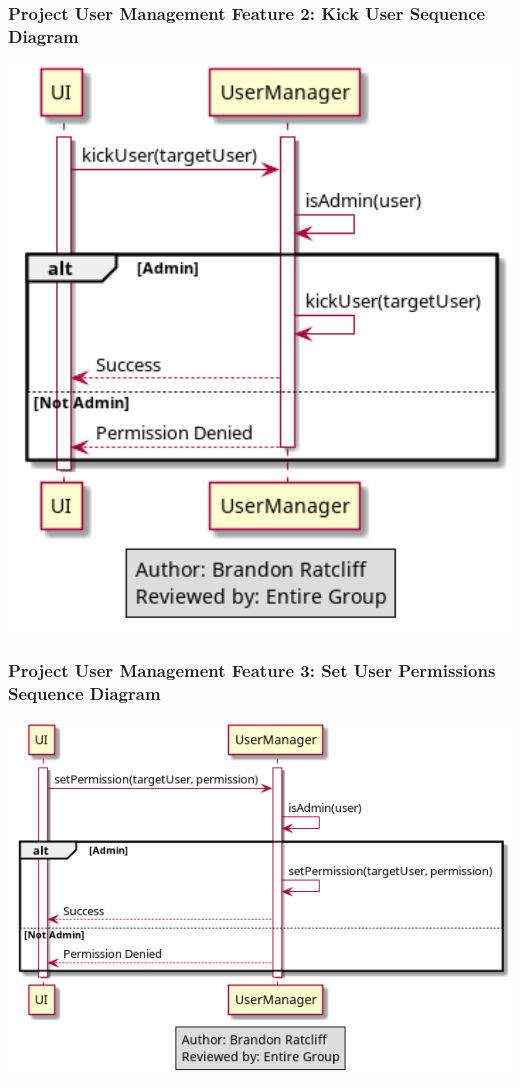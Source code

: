 \documentclass[twoside,letterpaper]{article}
\begin{document}
	\newpage
	
	\subsubsection[Project User Management Feature 2: Kick User Sequence Diagram]{\rmfamily\bfseries\color{black}
		Project User Management Feature 2: Kick User Sequence Diagram}
	\hypertarget{RefHeading22059017292}{}
	\includegraphics[width=6.0in]{images/SequenceDiagrams/ProjectUserManagementKickUser}
	\newpage
	
	\subsubsection[Project User Management Feature 3: Set User Permissions Sequence Diagram]{\rmfamily\bfseries\color{black}
		Project User Management Feature 3: Set User Permissions Sequence Diagram}
	\hypertarget{RefHeading22059017292}{}
	\includegraphics[width=6.0in]{images/SequenceDiagrams/ProjectUserManagementSetPermission}
	\newpage
	
\end{document}
